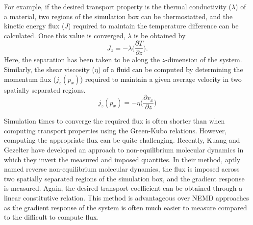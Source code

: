 For example, if the desired transport property is the thermal conductivity
($\lambda$) of a material, two regions of the simulation box can be
thermostatted, and the kinetic energy flux ($J$) required to maintain
the temperature difference can be calculated. Once this value is
converged, $\lambda$ is be obtained by
\begin{equation}\label{eq:thermalTransport}
J_{z} = - \lambda \big(\frac{\partial T}{\partial z}\big).
\end{equation}
Here, the separation has been taken to be along the $z$-dimension of
the system.  Similarly, the shear viscosity ($\eta$) of a fluid can be
computed by determining the momentum flux ($ j_{z}(p_{x})$) required
to maintain a given average velocity in two spatially separated
regions.
\begin{equation}\label{eq:momentumTransport}
  j_{z}(p_{x}) = -\eta \big(\frac{\partial v_{x}}{\partial z}\big)
\end{equation}

Simulation times to converge the required flux is often shorter than
when computing transport properties using the Green-Kubo
relations. However, computing the appropriate flux can be quite
challenging. Recently, Kuang and Gezelter have developed an approach
to non-equilibrium molecular dynamics in which they invert the
measured and imposed quantites.\cite{Kuang2010,Kuang2012} In their
method, aptly named reverse non-equilibrium molecular dynamics, the
flux is imposed across two spatially separated regions of the
simulation box, and the gradient response is measured. Again, the
desired transport coefficient can be obtained through a linear
constitutive relation. This method is advantageous over NEMD
approaches as the gradient response of the system is often much easier
to measure compared to the difficult to compute flux.


